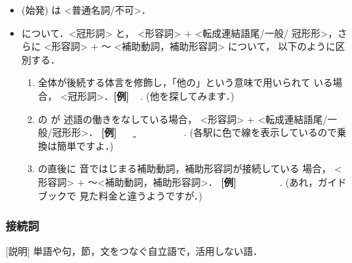 \begin{itemize}
\item {}
(始発) は <普通名詞/不可>．

\item 
{}
 について．<冠形詞> 
 と，
<形容詞> + 
<転成連結語尾/一般/
冠形形>，さらに 
<形容詞> + 
〜 <補助動詞，補助形容詞> について，
以下のように区別する．

\begin{enumerate}
\item {}
 全体が後続する体言を修飾し，「他の」という意味で用いられて
  いる場合，
<冠形詞>．{\bf [例]} \underline{
} 
\ 
. (他を探してみます．)
\item {}
 の 
 が 述語の働きをなしている場合，
<形容詞> + 
 <転成連結語尾/一般/冠形形>． {\bf [例]} 
\ 
\  \underline{
} 
\ 
\ 
\ 
\ 
\ 
\ 
.
  (各駅に色で線を表示しているので乗換は簡単ですよ．)
\item {}
 の直後に 
 音ではじまる補助動詞，補助形容詞が接続している
  場合，
<形容詞> + 
〜<補助動詞，補助形容詞>． {\bf [例]} 
\ 
\ 
\ 
 \underline{
}\ 
\ 
. (あれ，ガイドブックで
  見た料金と違うようですが．)
\end{enumerate}

\end{itemize}        

\subsubsection{接続詞}        
[説明] 単語や句，節，文をつなぐ自立語で，活用しない語．


